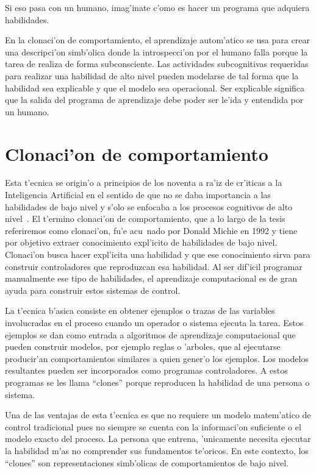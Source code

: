 \documentclass[11pt]{article}
\begin{document}
\medskip
Si eso pasa con un humano, imag'inate c'omo es hacer un programa que adquiera habilidades.

\medskip
En la clonaci'on de comportamiento, el aprendizaje autom'atico se usa para crear una descripci'on simb'olica donde la introspecci'on por el humano falla porque la tarea de realiza de forma subconsciente. Las actividades subcognitivas requeridas para realizar una habilidad de alto nivel pueden modelarse de tal forma que la habilidad sea explicable y que el modelo sea operacional. Ser explicable significa que la salida del programa de aprendizaje debe poder ser le'ida y entendida por un humano.

\section {Clonaci'on de comportamiento}

Esta t'ecnica se origin'o a principios de los noventa a ra'iz de cr'iticas a la Inteligencia Artificial en el sentido de que no se daba importancia a las habilidades de bajo nivel y s'olo se enfocaba a los procesos cognitivos de alto nivel~\cite{michiesammut:cloning}. El t'ermino \textsf{clonaci'on de comportamiento}, que a lo largo de la tesis referiremos como \textsf{clonaci'on}, fu'e acu~nado por Donald Michie en 1992 y tiene por objetivo extraer conocimiento expl'icito de habilidades de bajo nivel. \textsf{Clonaci'on} busca hacer expl'icita una habilidad y que ese conocimiento sirva para construir controladores que reproduzcan esa habilidad. Al ser dif'icil programar manualmente ese tipo de habilidades, el aprendizaje computacional es de gran ayuda para construir estos sistemas de control.

La t'ecnica b'asica consiste en obtener ejemplos o trazas de las variables involucradas en el proceso cuando un operador o sistema ejecuta la tarea. Estos ejemplos se dan como entrada a algoritmos de aprendizaje computacional que pueden construir modelos, por ejemplo reglas o 'arboles, que al ejecutarse producir'an comportamientos similares a quien gener'o los ejemplos. Los modelos resultantes pueden ser incorporados como programas controladores. A estos programas se les llama ``clones'' porque reproducen la habilidad de una persona o sistema.

Una de las ventajas de esta t'ecnica es que no requiere un modelo matem'atico de control tradicional pues no siempre se cuenta con la informaci'on suficiente o el modelo exacto del proceso. La persona que entrena, 'unicamente necesita ejecutar la habilidad m'as no comprender sus fundamentos te'oricos. En este contexto, los ``clones'' son representaciones simb'olicas de comportamientos de bajo nivel. 
\end{document}
